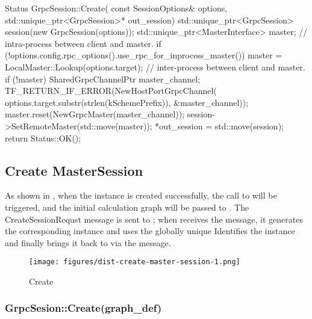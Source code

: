 \begin{content}
\begin{leftbar}
\begin{c++}
Status GrpcSession::Create(
    const SessionOptions& options,
    std::unique_ptr<GrpcSession>* out_session) {
  std::unique_ptr<GrpcSession> session(new GrpcSession(options));
  std::unique_ptr<MasterInterface> master;
  // intra-process between client and master.
  if (!options.config.rpc_options().use_rpc_for_inprocess_master()) {
    master = LocalMaster::Lookup(options.target);
  }
  // inter-process between client and master.
  if (!master) {
    SharedGrpcChannelPtr master_channel;
    TF_RETURN_IF_ERROR(NewHostPortGrpcChannel(
        options.target.substr(strlen(kSchemePrefix)), &master_channel));
    master.reset(NewGrpcMaster(master_channel));
  }
  session->SetRemoteMaster(std::move(master));
  *out_session = std::move(session);
  return Status::OK();
}
\end{c++}
\end{leftbar}

\subsection{Create MasterSession}

As shown in , when the  instance is created successfully, the call to  will be triggered, and the initial calculation graph will be passed to \code. The {CreateSessionRequst} message is sent to ; when  receives the  message, it generates the corresponding  instance and uses the globally unique  Identifies the instance and finally brings it back to  via the  message.

\begin{figure}[H]
\centering
\texttt{[image: figures/dist-create-master-session-1.png]}
\caption{Create}
 \label{fig:dist-create-master-session-1}
\end{figure}


\subsubsection{GrpcSesion::Create(graph\_def)}


\end{content}
